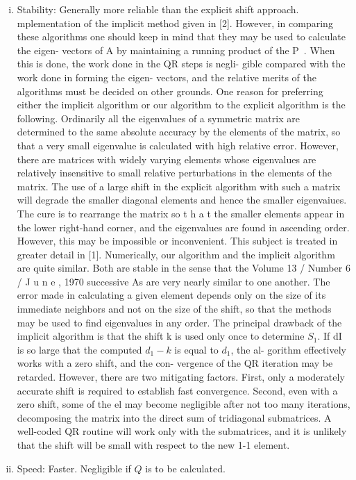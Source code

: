 \begin{enumerate}[(i):]
\item Stability: Generally more reliable than the explicit shift approach.
mplementation of the implicit method given in [2].
However, in comparing these algorithms one should
keep in mind that they may be used to calculate the eigen-
vectors of A by maintaining a running product of the P~.
When this is done, the work done in the QR steps is negli-
gible compared with the work done in forming the eigen-
vectors, and the relative merits of the algorithms must be
decided on other grounds.
One reason for preferring either the implicit algorithm
or our algorithm to the explicit algorithm is the following.
Ordinarily all the eigenvalues of a symmetric matrix are
determined to the same absolute accuracy by the elements
of the matrix, so that a very small eigenvalue is calculated
with high relative error. However, there are matrices with
widely varying elements whose eigenvalues are relatively
insensitive to small relative perturbations in the elements
of the matrix. The use of a large shift in the explicit
algorithm with such a matrix will degrade the smaller
diagonal elements and hence the smaller eigenvaiues.
The cure is to rearrange the matrix so t h a t the smaller
elements appear in the lower right-hand corner, and the
eigenvalues are found in ascending order. However, this
may be impossible or inconvenient. This subject is treated
in greater detail in [1].
Numerically, our algorithm and the implicit algorithm
are quite similar. Both are stable in the sense that the
Volume 13 / Number 6 / J u n e , 1970
successive As are very nearly similar to one another. The
error made in calculating a given element depends only
on the size of its immediate neighbors and not on the size
of the shift, so that the methods may be used to find
eigenvalues in any order.
The principal drawback of the implicit algorithm is that
the shift k is used only once to determine $S_1$. If dI is
so large that the computed $d_1 - k$ is equal to $d_1$, the al-
gorithm effectively works with a zero shift, and the con-
vergence of the QR iteration may be retarded. However,
there are two mitigating factors. First, only a moderately
accurate shift is required to establish fast convergence.
Second, even with a zero shift, some of the el may become
negligible after not too many iterations, decomposing the
matrix into the direct sum of tridiagonal submatrices. A
well-coded QR routine will work only with the submatrices,
and it is unlikely that the shift will be small with respect
to the new 1-1 element.
	
\item Speed: Faster. Negligible if $Q$ is to be calculated.
\end{enumerate}


